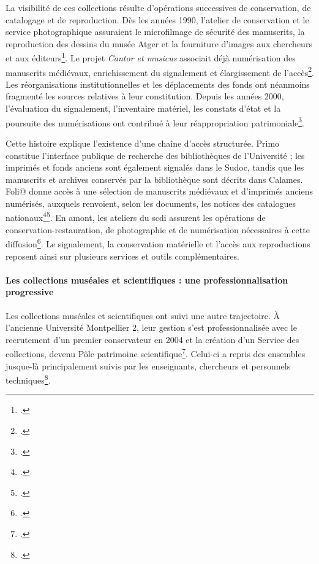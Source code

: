 La visibilité de ces collections résulte d'opérations successives de conservation, de catalogage et de reproduction. Dès les années 1990, l'atelier de conservation et le service photographique assuraient le microfilmage de sécurité des manuscrits, la reproduction des dessins du musée Atger et la fourniture d'images aux chercheurs et aux éditeurs\footcite[42--43]{Nicq1996}. Le projet \emph{Cantor et musicus} associait déjà numérisation des manuscrits médiévaux, enrichissement du \gls{signalement} et élargissement de l'accès\footcite[39--44]{Vial2001}. Les réorganisations institutionnelles et les déplacements des fonds ont néanmoins fragmenté les sources relatives à leur constitution. Depuis les années 2000, l'évaluation du \gls{signalement}, l'inventaire matériel, les constats d'état et la poursuite des numérisations ont contribué à leur réappropriation patrimoniale\footcite{Denton2025}.

Cette histoire explique l'existence d'une chaîne d'accès structurée. Primo constitue l'interface publique de recherche des bibliothèques de l'Université ; les imprimés et fonds anciens sont également signalés dans le Sudoc, tandis que les manuscrits et archives conservés par la bibliothèque sont décrits dans Calames. Foli@ donne accès à une sélection de manuscrits médiévaux et d'imprimés anciens numérisés, auxquels renvoient, selon les documents, les notices des catalogues nationaux\footcite{UMServicesPatrimoine}\footcite{SCDIFolia}. En amont, les ateliers du \gls{scdi} assurent les opérations de conservation-restauration, de photographie et de numérisation nécessaires à cette diffusion\footcite{SCDI2022}. Le \gls{signalement}, la conservation matérielle et l'accès aux reproductions reposent ainsi sur plusieurs services et outils complémentaires.

\paragraph{Les collections muséales et scientifiques : une professionnalisation progressive}

Les collections muséales et scientifiques ont suivi une autre trajectoire. À l'ancienne Université Montpellier 2, leur gestion s'est professionnalisée avec le recrutement d'un premier conservateur en 2004 et la création d'un Service des collections, devenu Pôle patrimoine scientifique\footcite{Gomel2011}. Celui-ci a repris des ensembles jusque-là principalement suivis par les enseignants, chercheurs et personnels techniques\footcite{Gomel2011}.


